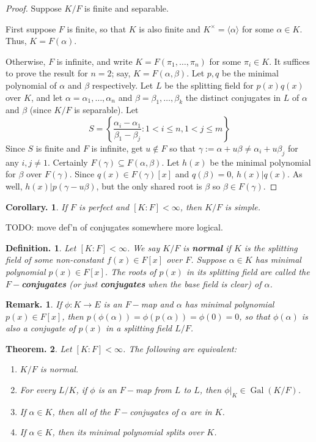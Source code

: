 \documentclass[11pt, a4paper]{memoir}
\newcommand{\mbf}[1]{{\boldmath\bfseries #1}}
\theoremstyle{change}
\newtheorem{theorem}{Theorem.}[section]
\newtheorem{corollary}[theorem]{Corollary.}
\theoremstyle{plain}
\theoremstyle{nonumberplain}
\newtheorem{definition}{Definition.}
\newtheorem{remark}{Remark.}
\newtheorem{proof}{Proof}
\DeclareMathOperator{\Gal}{Gal}
\numberwithin{equation}{section}
\begin{document}
\begin{proof}
    Suppose $K/F$ is finite and separable.

    First suppose $F$ is finite, so that $K$ is also finite and $K^\times=\langle\alpha\rangle$ for some $\alpha\in K$.
    Thus, $K=F(\alpha)$.

    Otherwise, $F$ is infinite, and write $K=F(\pi_1,\ldots,\pi_n)$ for some $\pi_i\in K$.
    It suffices to prove the result for $n=2$; say, $K=F(\alpha,\beta)$.
    Let $p,q$ be the minimal polynomial of $\alpha$ and $\beta$ respectively.
    Let $L$ be the splitting field for $p(x)q(x)$ over $K$, and let $\alpha=\alpha_1,\ldots,\alpha_n$ and $\beta=\beta_1,\ldots,\beta_k$ the distinct conjugates in $L$ of $\alpha$ and $\beta$ (since $K/F$ is separable).
    Let
    \begin{equation*}
        S=\left\{\frac{\alpha_i-\alpha_1}{\beta_1-\beta_j}:1<i\leq n,1<j\leq m\right\}
    \end{equation*}
    Since $S$ is finite and $F$ is infinite, get $u\notin F$ so that $\gamma:=\alpha+u\beta\neq\alpha_i+u\beta_j$ for any $i,j\neq 1$.
    Certainly $F(\gamma)\subseteq F(\alpha,\beta)$.
    Let $h(x)$ be the minimal polynomial for $\beta$ over $F(\gamma)$.
    Since $q(x)\in F(\gamma)[x]$ and $q(\beta)=0$, $h(x)|q(x)$.
    As well, $h(x)|p(\gamma-u\beta)$, but the only shared root is $\beta$ so $\beta\in F(\gamma)$.
\end{proof}
\begin{corollary}
    If $F$ is perfect and $[K:F]<\infty$, then $K/F$ is simple.
\end{corollary}
TODO: move def'n of conjugates somewhere more logical.
\begin{definition}
    Let $[K:F]<\infty$.
    We say $K/F$ is \mbf{normal} if $K$ is the splitting field of some non-constant $f(x)\in F[x]$ over $F$.
    Suppose $\alpha\in K$ has minimal polynomial $p(x)\in F[x]$.
    The roots of $p(x)$ in its splitting field are called the \mbf{$F-$conjugates} (or just \mbf{conjugates} when the base field is clear) of $\alpha$.
\end{definition}
\begin{remark}
    If $\phi:K\to E$ is an $F-$map and $\alpha$ has minimal polynomial $p(x)\in F[x]$, then $p(\phi(\alpha))=\phi(p(\alpha))=\phi(0)=0$, so that $\phi(\alpha)$ is also a conjugate of $p(x)$ in a splitting field $L/F$.
\end{remark}
\begin{theorem}
    Let $[K:F]<\infty$.
    The following are equivalent:
    \begin{enumerate}[nolistsep]
        \item $K/F$ is normal.
        \item For every $L/K$, if $\phi$ is an $F-$map from $L$ to $L$, then $\phi|_K\in\Gal(K/F)$.
        \item If $\alpha\in K$, then all of the $F-$conjugates of $\alpha$ are in $K$.
        \item If $\alpha\in K$, then its minimal polynomial splits over $K$.
    \end{enumerate}
\end{theorem}
\end{document}
